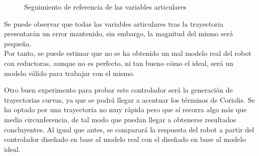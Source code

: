 \begin{itemize}
\begin{figure}[h!]
		\caption{Seguimiento de referencia de las variables articulares}

	\end{figure}



	Se puede observar que todas las variables articulares tras la trayectoria presentarán un error mantenido, sin embargo, la magnitud del mismo será pequeña.\\

	Por tanto, se puede estimar que no se ha obtenido un mal modelo real del robot con reductoras, aunque no es perfecto, ni tan bueno cómo el ideal, será un modelo válido para trabajar con el mismo.



\end{itemize}



Otro buen experimento para probar este controlador será la generación de trayectorias curvas, ya que se podrá llegar a acentuar los términos de Coriolis. Se ha optado por una trayectoria no muy rápida pero que sí recorra algo más que media circunferencia, de tal modo que puedan llegar a obtenerse resultados concluyentes. Al igual que antes, se comparará la respuesta del robot a partir del controlador diseñado en base al modelo real con el diseñado en base al modelo ideal. \\

